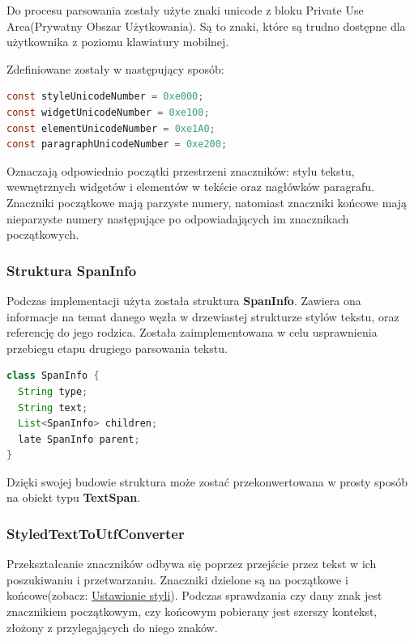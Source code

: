Do procesu parsowania zostały użyte znaki unicode z bloku Private Use Area(Prywatny Obszar Użytkowania). Są to znaki, które są trudno dostępne dla użytkownika z poziomu klawiatury mobilnej.

\noindent Zdefiniowane zostały w następujący sposób:

\begin{lstlisting}[language=java]
const styleUnicodeNumber = 0xe000;
const widgetUnicodeNumber = 0xe100;
const elementUnicodeNumber = 0xe1A0;
const paragraphUnicodeNumber = 0xe200;
\end{lstlisting}

Oznaczają odpowiednio początki przestrzeni znaczników: stylu tekstu, wewnętrznych widgetów i elementów w tekście oraz nagłówków paragrafu.
Znaczniki początkowe mają parzyste numery, natomiast znaczniki końcowe mają nieparzyste numery następujące po odpowiadających im znacznikach początkowych.

\newpage

\subsubsection{Struktura SpanInfo}

Podczas implementacji użyta została struktura \textbf{SpanInfo}. Zawiera ona informacje na temat danego węzła w drzewiastej strukturze stylów tekstu, oraz referencję do jego rodzica.
Została zaimplementowana w celu usprawnienia przebiegu etapu drugiego parsowania tekstu.

\begin{lstlisting}[language=java]
class SpanInfo {
  String type;
  String text;
  List<SpanInfo> children;
  late SpanInfo parent;
}
\end{lstlisting}

Dzięki swojej budowie struktura może zostać przekonwertowana w prosty sposób na obiekt typu \textbf{TextSpan}.

\subsubsection{StyledTextToUtfConverter}

Przekształcanie znaczników odbywa się poprzez przejście przez tekst w ich poszukiwaniu i przetwarzaniu. Znaczniki dzielone są na początkowe i końcowe(zobacz: \hyperref[subsec:ustawianieStyli]{Ustawianie styli}). Podczas sprawdzania czy dany znak jest znacznikiem początkowym, czy końcowym pobierany jest szerszy kontekst, złożony z przylegających do niego znaków.

